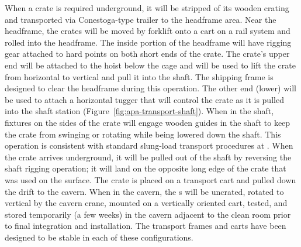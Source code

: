 When a crate is required underground, %
it will be stripped of its wooden crating and %
 transported via Conestoga-type trailer to the headframe area. Near the headframe, the crates will be moved by forklift onto a cart on a rail system and rolled into the headframe. The inside portion of the headframe will have rigging gear attached to hard points on both short ends of the crate. %
 The crate's upper end will be attached %
 to the hoist below the cage and will be used to lift the crate from horizontal to vertical and pull it into the shaft. The shipping frame is designed to clear the headframe during this operation. The other end (lower) will be used to attach a horizontal tugger that will control the crate as it is pulled into the shaft station (Figure~\ref{fig:apa-transport-shaft}). When in the shaft, fixtures on the sides of the crate will engage wooden guides in the shaft to keep the crate from swinging or rotating while being lowered down the shaft. This operation is consistent with standard slung-load transport procedures at . When the crate arrives underground, it will be pulled out of the shaft by reversing the shaft rigging operation; it will land on the opposite long edge of the crate that was used on the surface. The crate is placed on a transport cart and pulled down the drift to the cavern. When in the cavern, the s will be uncrated, rotated to vertical by the cavern crane, mounted on a vertically oriented cart, tested, and stored temporarily (a few weeks) in the cavern adjacent to the clean room prior to final integration and installation. The transport frames and carts have been designed to be stable in each of these configurations. 

